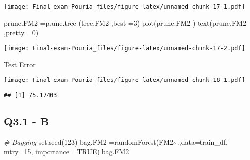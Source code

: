 \documentclass[
]{article}
\newenvironment{Shaded}{\begin{snugshade}}{\end{snugshade}}
\newcommand{\AttributeTok}[1]{\textcolor[rgb]{0.77,0.63,0.00}{#1}}
\newcommand{\CommentTok}[1]{\textcolor[rgb]{0.56,0.35,0.01}{\textit{#1}}}
\newcommand{\ConstantTok}[1]{\textcolor[rgb]{0.00,0.00,0.00}{#1}}
\newcommand{\DecValTok}[1]{\textcolor[rgb]{0.00,0.00,0.81}{#1}}
\newcommand{\FunctionTok}[1]{\textcolor[rgb]{0.00,0.00,0.00}{#1}}
\newcommand{\NormalTok}[1]{#1}
\newcommand{\OtherTok}[1]{\textcolor[rgb]{0.56,0.35,0.01}{#1}}
\newcommand{\SpecialCharTok}[1]{\textcolor[rgb]{0.00,0.00,0.00}{#1}}
\begin{document}
\texttt{[image: Final-exam-Pouria\_files/figure-latex/unnamed-chunk-17-1.pdf]}

\begin{Shaded}
\begin{Highlighting}[]
\NormalTok{prune.FM2 }\OtherTok{=}\FunctionTok{prune.tree}\NormalTok{ (tree.FM2 ,}\AttributeTok{best =}\DecValTok{3}\NormalTok{)}
\FunctionTok{plot}\NormalTok{(prune.FM2 )}
\FunctionTok{text}\NormalTok{(prune.FM2 ,}\AttributeTok{pretty =}\DecValTok{0}\NormalTok{)}
\end{Highlighting}
\end{Shaded}

\texttt{[image: Final-exam-Pouria\_files/figure-latex/unnamed-chunk-17-2.pdf]}

Test Error

\begin{Shaded}
\end{Shaded}

\texttt{[image: Final-exam-Pouria\_files/figure-latex/unnamed-chunk-18-1.pdf]}

\begin{Shaded}
\end{Shaded}

\begin{verbatim}
## [1] 75.17403
\end{verbatim}

\hypertarget{q3.1---b}{%
\subsection{Q3.1 - B}\label{q3.1---b}}

\begin{Shaded}
\begin{Highlighting}[]
\CommentTok{\# Bagging}
\FunctionTok{set.seed}\NormalTok{(}\DecValTok{123}\NormalTok{)}
\NormalTok{bag.FM2 }\OtherTok{=}\FunctionTok{randomForest}\NormalTok{(FM2}\SpecialCharTok{\textasciitilde{}}\NormalTok{.,}\AttributeTok{data=}\NormalTok{train\_df, }\AttributeTok{mtry=}\DecValTok{15}\NormalTok{, }\AttributeTok{importance =}\ConstantTok{TRUE}\NormalTok{)}
\NormalTok{bag.FM2}
\end{Highlighting}
\end{Shaded}
\end{document}
